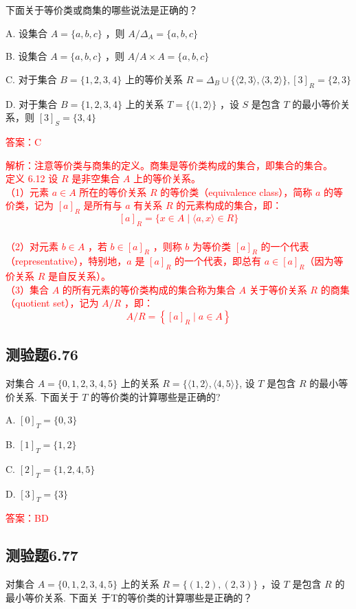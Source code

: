 \documentclass[UTF8, heading=true]{ctexart}
\begin{document}
下面关于等价类或商集的哪些说法是正确的？

A. 设集合 $A=\{a, b, c\}$ ，则 $A / \Delta_A=\{a, b, c\}$

B. 设集合 $A=\{a, b, c\}$ ，则 $A / A \times A=\{a, b, c\}$

C. 对于集合 $B=\{1,2,3,4\}$ 上的等价关系 $R=\Delta_B \cup\{\langle 2,3\rangle,\langle 3,2\rangle\},[3]_R=\{2,3\}$

D. 对于集合 $B=\{1,2,3,4\}$ 上的关系 $T=\{\langle 1,2\rangle\}$ ，设 $S$ 是包含 $T$ 的最小等价关系，则 $[3]_S=\{3,4\}$

\textcolor{red}{答案：C}

\textcolor{red}{解析：注意等价类与商集的定义。商集是等价类构成的集合，即集合的集合。\\ \indent
定义 6.12 设 $R$ 是非空集合 $A$ 上的等价关系。\\ \indent
（1）元素 $a \in A$ 所在的等价关系 $R$ 的等价类（equivalence class），简称 $a$ 的等价类，记为 $[a]_R$ 是所有与 $a$ 有关系 $R$ 的元素构成的集合，即：
$$
[a]_R=\{x \in A \mid\langle a, x\rangle \in R\}
$$
\\ \indent（2）对元素 $b \in A$ ，若 $b \in[a]_R$ ，则称 $b$ 为等价类 $[a]_R$ 的一个代表（representative），特别地，$a$ 是 $[a]_R$ 的一个代表，即总有 $a \in[a]_R$（因为等价关系 $R$ 是自反关系）。
\\ \indent（3）集合 $A$ 的所有元素的等价类构成的集合称为集合 $A$ 关于等价关系 $R$ 的商集（quotient set），记为 $A / R$ ，即：
$$
A / R=\left\{[a]_R \mid a \in A\right\}
$$
}


\subsection{测验题6.76}

对集合 $A=\{0,1,2,3,4,5\}$ 上的关系 $R=\{\langle 1,2\rangle,\langle 4,5\rangle \}$, 设 $T$ 是包含 $R$ 的最小等价关系. 下面关于 $T$ 的等价类的计算哪些是正确的?

A. $[0]_T=\{0,3\}$

B. $[1]_T=\{1,2\}$

C. $[2]_T=\{1,2,4,5\}$

D. $[3]_T=\{3\}$

\textcolor{red}{答案：BD}

\subsection{测验题6.77}

对集合 $A=\{0,1,2,3,4,5\}$ 上的关系 $R=\{(1,2),(2,3)\}$ ，设 $T$ 是包含 $R$ 的最小等价关系. 下面关
于T的等价类的计算哪些是正确的？
\end{document}
